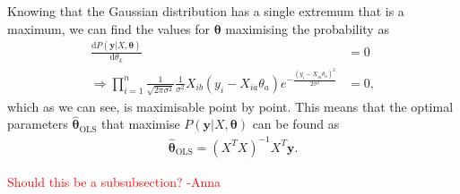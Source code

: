 \documentclass[twocolumn,english,notitlepage]{article}
\newcommand{\comment}[1]{\textcolor{red}{#1}\\}
\renewcommand{\d}[2][x]{\ensuremath{\frac{\mathrm{d}#2}{\mathrm{d}#1}}}
\renewcommand{\vec}[1]{\boldsymbol{#1}}
\newcommand{\pclosed}[1]{\left(#1\right)}
\renewcommand{\exp}[1]{e^{#1}}
\newcommand{\msub}[2]{\ensuremath{{#1}_\text{#2}}}
\begin{document}
            Knowing that the Gaussian distribution has a single extremum that is a maximum, we can find the values for $\vec{\theta}$ maximising the probability as
            \begin{align} \nonumber
                \d[\theta_k]{P(\vec{y}|X,\vec{\theta})} &= 0 \\
                \Rightarrow \prod_{i=1}^{n} \frac{1}{\sqrt{2\pi\sigma^2}} \frac{1}{\sigma^2} X_{ib}(y_i-X_{ia}\theta_a) \exp{-\frac{{(y_i - X_{ia}\theta_a)}^2}{2\sigma^2}} &= 0,
            \end{align}
            which as we can see, is maximisable point by point. This means that the optimal parameters $\msub{\vec{\hat{\theta}}}{OLS}$ that maximise $P(\vec{y}|X, \vec{\theta})$ can be found as
            \begin{align}
                \boxed{
                \msub{\vec{\hat{\theta}}}{OLS} = \pclosed{X^TX}^{-1} X^T \vec{y}.
                }
            \end{align}

        \comment{Should this be a subsubsection? -Anna}
\end{document}
